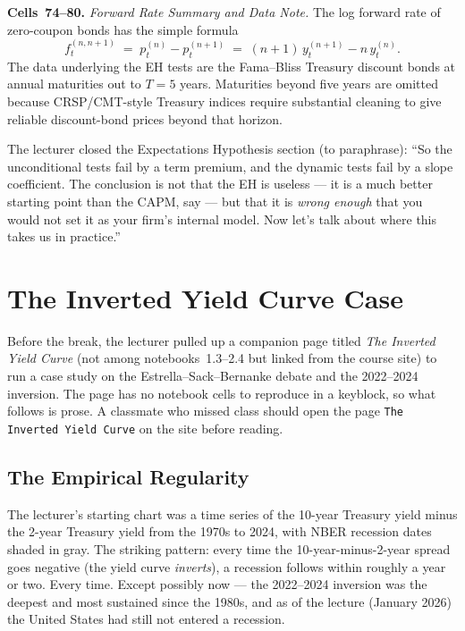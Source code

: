 \begin{keyblock}
\textbf{Cells~74--80.} \emph{Forward Rate Summary and Data Note.}
The log forward rate of zero-coupon bonds has the simple formula
\[
   f_t^{(n,n+1)} \;=\; p^{(n)}_t - p^{(n+1)}_t
                 \;=\; (n+1)\,y^{(n+1)}_t - n\,y^{(n)}_t.
\]
The data underlying the EH tests are the Fama--Bliss Treasury discount bonds
at annual maturities out to $T=5$ years. Maturities beyond five years are
omitted because CRSP/CMT-style Treasury indices require substantial
cleaning to give reliable discount-bond prices beyond that horizon.
\end{keyblock}

The lecturer closed the Expectations Hypothesis section (to paraphrase): ``So
the unconditional tests fail by a term premium, and the dynamic tests fail by
a slope coefficient. The conclusion is not that the EH is useless --- it is a
much better starting point than the CAPM, say --- but that it is
\emph{wrong enough} that you would not set it as your firm's internal model.
Now let's talk about where this takes us in practice.''

\section{The Inverted Yield Curve Case}\label{L2-sec:invyc}

Before the break, the lecturer pulled up a companion page titled \emph{The
Inverted Yield Curve} (not among notebooks~1.3--2.4 but linked from the course
site) to run a case study on the Estrella--Sack--Bernanke debate and the
2022--2024 inversion. The page has no notebook cells to reproduce in a
keyblock, so what follows is prose. A classmate who missed class should open
the page \texttt{The Inverted Yield Curve} on the site before reading.

\subsection{The Empirical Regularity}\label{L2-sec:invyc-empirical}

The lecturer's starting chart was a time series of the 10-year Treasury yield
minus the 2-year Treasury yield from the 1970s to 2024, with NBER recession
dates shaded in gray. The striking pattern: every time the 10-year-minus-2-year
spread goes negative (the yield curve \emph{inverts}), a recession follows
within roughly a year or two. Every time. Except possibly now --- the
2022--2024 inversion was the deepest and most sustained since the 1980s, and
as of the lecture (January 2026) the United States had still not entered a
recession.

